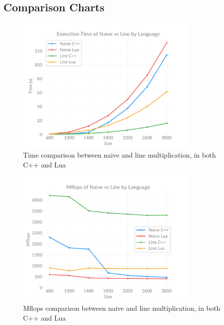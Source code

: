 \subsection{Comparison Charts} \label{section:appendix:charts}

    \begin{figure}[ht]
        \centering
        \captionsetup{justification=centering, margin=2cm}
        \includegraphics[width=0.8\textwidth]{pdf/naive-line-time}
        \caption{Time comparison between naive and line multiplication, in both C++ and Lua}
        \label{fig:chart:naive-line-time}
    \end{figure}

    \begin{figure}[ht]
        \centering
        \captionsetup{justification=centering, margin=2cm}
        \includegraphics[width=0.8\textwidth]{pdf/naive-line-flops}
        \caption{Mflops comparison between naive and line multiplication, in both C++ and Lua}
        \label{fig:chart:naive-line-flops}
    \end{figure}

